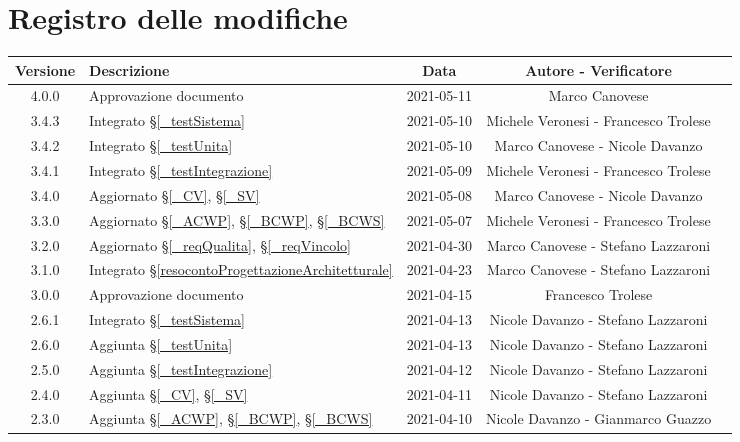 \section*{Registro delle modifiche}

\begin{center}
	\begin{longtable}{|c|p{5cm}|c|c|c|}
	\hline
	\rowcolor{lighter-grayer}
	\textbf{Versione} & \textbf{Descrizione} & \textbf{Data} & \textbf{Autore - Verificatore} \\
	\hline
	\endfirsthead


	\hline
	4.0.0 & Approvazione documento & 2021-05-11 & Marco Canovese \\
	3.4.3 & Integrato \S\ref{_testSistema} & 2021-05-10 & Michele Veronesi - Francesco Trolese \\
	3.4.2 & Integrato \S\ref{_testUnita} & 2021-05-10 & Marco Canovese - Nicole Davanzo \\
	3.4.1 & Integrato \S\ref{_testIntegrazione} & 2021-05-09 & Michele Veronesi - Francesco Trolese \\
	3.4.0 & Aggiornato \S\ref{_CV}, \S\ref{_SV} & 2021-05-08 & Marco Canovese - Nicole Davanzo \\
	3.3.0 & Aggiornato \S\ref{_ACWP}, \S\ref{_BCWP}, \S\ref{_BCWS} & 2021-05-07 & Michele Veronesi - Francesco Trolese \\
	3.2.0 & Aggiornato \S\ref{_reqQualita}, \S\ref{_reqVincolo} & 2021-04-30 & Marco Canovese - Stefano Lazzaroni \\
	3.1.0 & Integrato \S\ref{resocontoProgettazioneArchitetturale} & 2021-04-23 & Marco Canovese - Stefano Lazzaroni \\
	3.0.0 & Approvazione documento & 2021-04-15 & Francesco Trolese \\
	2.6.1 & Integrato \S\ref{_testSistema} & 2021-04-13 & Nicole Davanzo - Stefano Lazzaroni \\
	2.6.0 & Aggiunta \S\ref{_testUnita} & 2021-04-13 & Nicole Davanzo - Stefano Lazzaroni \\
	2.5.0 & Aggiunta \S\ref{_testIntegrazione} & 2021-04-12 & Nicole Davanzo - Stefano Lazzaroni \\
	2.4.0 & Aggiunta \S\ref{_CV}, \S\ref{_SV} & 2021-04-11 & Nicole Davanzo - Stefano Lazzaroni \\
	2.3.0 & Aggiunta \S\ref{_ACWP}, \S\ref{_BCWP}, \S\ref{_BCWS} & 2021-04-10 & Nicole Davanzo - Gianmarco Guazzo \\

\end{longtable}
\end{center}
